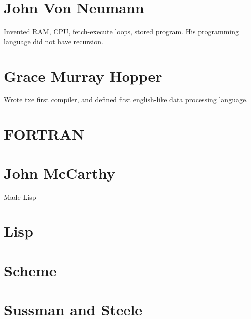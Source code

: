 \documentclass[10pt,letter]{article}
\begin{document}
\section*{John Von Neumann}
Invented RAM, CPU, fetch-execute loops, stored program. His programming language did not have recursion. 

\section*{Grace Murray Hopper}
Wrote txe first compiler, and defined first english-like data processing language. 

\section*{FORTRAN}


\section*{John McCarthy}
Made Lisp


\section*{Lisp}

\section*{Scheme}

\section*{Sussman and Steele}
\end{document}
